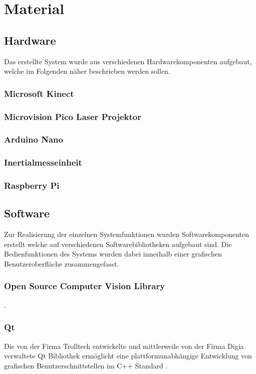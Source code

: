 \chapter{Material}
\label{chap:material}

\section{Hardware}
Das erstellte System wurde aus verschiedenen Hardwarekomponenten aufgebaut, welche im Folgenden näher beschrieben werden sollen.

\subsection{Microsoft Kinect}

\subsection{Microvision Pico Laser Projektor}

\subsection{Arduino Nano}

\subsection{Inertialmesseinheit}

\subsection{Raspberry Pi}

\section{Software}
Zur Realisierung der einzelnen Systemfunktionen wurden Softwarekomponenten erstellt welche auf verschiedenen Softwarebibliotheken aufgebaut sind. Die Bedienfunktionen des Systems wurden dabei innerhalb einer grafischen Benutzeroberfläche zusammengefasst.

\subsection{Open Source Computer Vision Library}
\cite{OpenCV}.

\subsection{Qt}
Die von der Firma Trolltech entwickelte und mittlerweile von der Firma Digia verwaltete Qt Bibliothek ermöglicht eine plattformunabhängige Entwicklung von grafischen Benutzerschnittstellen im C++ Standard \cite{Qt}.

